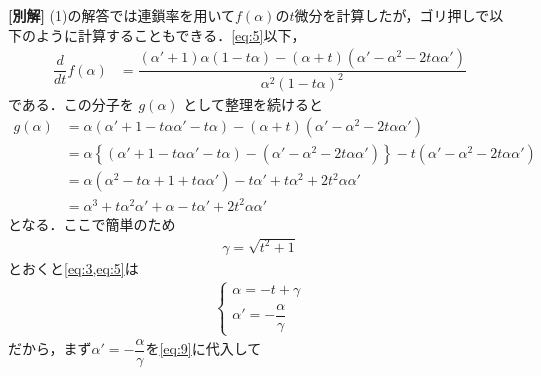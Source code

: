 \documentclass[../../main.tex]{subfiles}
\begin{document}
{\bf [別解]}
(1)の解答では連鎖率を用いて$f(\alpha)$の$t$微分を計算したが，ゴリ押しで以下のように計算することもできる．\cref{eq:5}以下，
\begin{align}
  \dfrac{d}{dt} f(\alpha)
  & = \dfrac{(\alpha' + 1) \alpha (1 - t\alpha) - (\alpha + t)(\alpha' - \alpha^2 - 2t\alpha \alpha')}{\alpha^2 (1 - t\alpha)^2} \label{eq:8}
\end{align}
である．この分子を $g(\alpha)$ として整理を続けると
\begin{align}
  g(\alpha)
  &= \alpha (\alpha' + 1 - t\alpha\alpha' - t\alpha) - (\alpha + t)(\alpha' - \alpha^2 - 2t\alpha\alpha') \\
  &= \alpha \left\{(\alpha' + 1 - t\alpha\alpha' - t\alpha)-(\alpha'-\alpha^2-2t\alpha\alpha')\right\} - t(\alpha' - \alpha^2 - 2t\alpha\alpha') \\
  &= \alpha (\alpha^2 - t\alpha + 1 + t\alpha\alpha') - t\alpha' + t\alpha^2 + 2t^2 \alpha\alpha' \\
  &= \alpha^3 + t\alpha^2\alpha' + \alpha - t\alpha' + 2t^2 \alpha\alpha' \label{eq:9}
\end{align}
となる．ここで簡単のため
\begin{align}
  \gamma = \sqrt{t^2+1} \label{eq:10}
\end{align}
とおくと\cref{eq:3,eq:5}は
\begin{align}
  \begin{cases}
    \alpha = -t + \gamma \\
    \alpha' = -\dfrac{\alpha}{\gamma}
  \end{cases} \label{eq:11}
\end{align}
だから，まず$\alpha' = -\dfrac{\alpha}{\gamma}$を\cref{eq:9}に代入して
\end{document}
